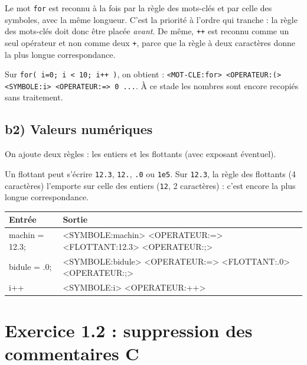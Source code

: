 \documentclass[11pt,a4paper]{article}
\begin{document}
\begin{idee}
Le mot \texttt{for} est reconnu à la fois par la règle des mots-clés et par celle des symboles,
avec la même longueur. C'est la priorité à l'ordre qui tranche : la règle des mots-clés doit donc
être placée \emph{avant}. De même, \texttt{++} est reconnu comme un seul opérateur et non comme
deux \texttt{+}, parce que la règle à deux caractères donne la plus longue correspondance.
\end{idee}

Sur \verb!for( i=0; i < 10; i++ )!, on obtient :
\verb!<MOT-CLE:for> <OPERATEUR:(> <SYMBOLE:i> <OPERATEUR:=> 0 ...!. À ce stade les nombres sont
encore recopiés sans traitement.

\subsection{b2) Valeurs numériques}

On ajoute deux règles : les entiers et les flottants (avec exposant éventuel).

Un flottant peut s'écrire \texttt{12.3}, \texttt{12.}, \texttt{.0} ou \texttt{1e5}.
Sur \texttt{12.3}, la règle des flottants (4 caractères) l'emporte sur celle des entiers
(\texttt{12}, 2 caractères) : c'est encore la plus longue correspondance.

\begin{center}
\begin{tabular}{>{\ttfamily}l >{\ttfamily}l}
\toprule
\textbf{\color{navy}Entrée} & \textbf{\color{navy}Sortie} \\
\midrule
machin = 12.3; & <SYMBOLE:machin> <OPERATEUR:=> <FLOTTANT:12.3> <OPERATEUR:;> \\
bidule = .0;   & <SYMBOLE:bidule> <OPERATEUR:=> <FLOTTANT:.0> <OPERATEUR:;> \\
i++            & <SYMBOLE:i> <OPERATEUR:++> \\
\bottomrule
\end{tabular}
\end{center}

\section{Exercice 1.2 : suppression des commentaires C}
\end{document}
